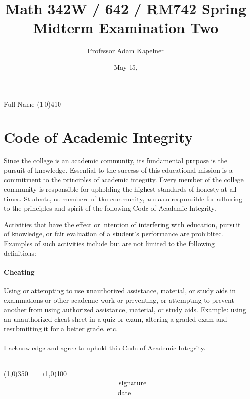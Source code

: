 \documentclass[12pt]{article}
\title{Math 342W / 642 / RM742 Spring \the\year{} \\ Midterm Examination Two}
\author{Professor Adam Kapelner}
\date{May 15, \the\year{}}
\begin{document}
\maketitle

\noindent Full Name \line(1,0){410}

\thispagestyle{empty}

\section*{Code of Academic Integrity}

\footnotesize
Since the college is an academic community, its fundamental purpose is the pursuit of knowledge. Essential to the success of this educational mission is a commitment to the principles of academic integrity. Every member of the college community is responsible for upholding the highest standards of honesty at all times. Students, as members of the community, are also responsible for adhering to the principles and spirit of the following Code of Academic Integrity.

Activities that have the effect or intention of interfering with education, pursuit of knowledge, or fair evaluation of a student's performance are prohibited. Examples of such activities include but are not limited to the following definitions:

\paragraph{Cheating} Using or attempting to use unauthorized assistance, material, or study aids in examinations or other academic work or preventing, or attempting to prevent, another from using authorized assistance, material, or study aids. Example: using an unauthorized cheat sheet in a quiz or exam, altering a graded exam and resubmitting it for a better grade, etc.\\
\\
\noindent I acknowledge and agree to uphold this Code of Academic Integrity. \\~\\

\begin{center}
\line(1,0){350} ~~~ \line(1,0){100}\\
~~~~~~~~~~~~~~~~~~~~~~~~~~~~~~~~~~signature~~~~~~~~~~~~~~~~~~~~~~~~~~~~~~~~~~~~~~~~~~~~~~~~~~~~~~~~~~~~~~ date
\end{center}

\normalsize
\end{document}
